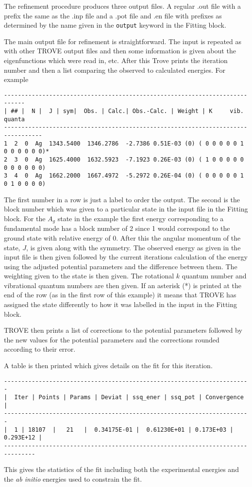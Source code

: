 The refinement procedure produces three output files. A regular .out file with a prefix the same as the .inp file and a 
.pot file and .en file with prefixes as determined by the name given in the \verb|output| keyword in the Fitting block. 

The main output file for refinement is straightforward. The input is repeated as with other TROVE output files and then
some information is given about the eigenfunctions which were read in, etc. After this Trove prints the iteration number 
and then a list comparing the observed to calculated energies. For example
\begin{verbatim}
----------------------------------------------------------------------------
| ## |  N |  J | sym|  Obs. | Calc.| Obs.-Calc. | Weight | K     vib. quanta
---------------------------------------------------------------------------------
1  2  0  Ag  1343.5400  1346.2786  -2.7386 0.51E-03 (0) ( 0 0 0 0 0 1 0 0 0 0 0 0)*
2  3  0  Ag  1625.4000  1632.5923  -7.1923 0.26E-03 (0) ( 1 0 0 0 0 0 0 0 0 0 0 0)
3  4  0  Ag  1662.2000  1667.4972  -5.2972 0.26E-04 (0) ( 0 0 0 0 0 1 0 1 0 0 0 0)
\end{verbatim}

The first number in a row is just a label to order the output. The second is the block number which was given to a particular
state in the input file in the Fitting block. For the $A_g$ state in the example the first energy corresponding to a 
fundamental mode has a block number of 2 since 1 would correspond to the ground state with relative energy of 0. After this
the angular momentum of the state, $J$, is given along with the symmetry. The observed energy as given in the input file
is then given followed by the current iterations calculation of the energy using the adjusted potential parameters and the
difference between them. The weighting given to the state is then given. The rotational $k$ quantum number and vibrational
quantum numbers are then given. If an asterisk (*) is printed at the end of the row (as in the first row of this example)
it means that TROVE has assigned the state differently to how it was labelled in the input in the Fitting block. 

TROVE then prints a list of corrections to the potential parameters followed by the new values for the potential parameters
and the corrections rounded according to their error. 

A table is then printed which gives details on the fit for this iteration.
\begin{verbatim}
-----------------------------------------------------------------------
|  Iter | Points | Params | Deviat | ssq_ener | ssq_pot | Convergence |
-----------------------------------------------------------------------
|  1 | 18107  |   21   |  0.34175E-01 |  0.61230E+01 | 0.173E+03 | 0.293E+12 |
-------------------------------------------------------------------------------
\end{verbatim}
This gives the statistics of the fit including both the experimental energies and the \textit{ab initio} energies used
to constrain the fit. 

